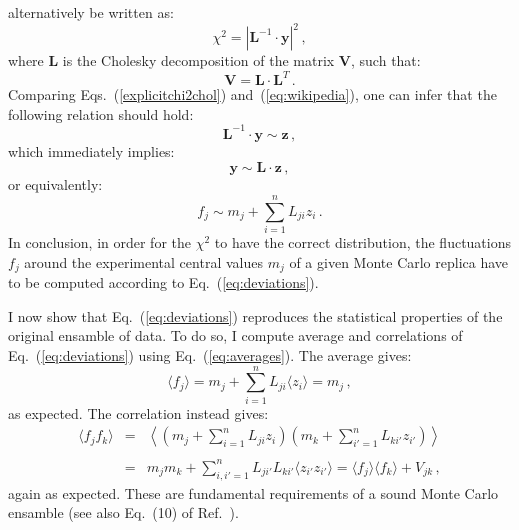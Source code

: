 \documentclass[10pt,a4paper]{article}
\begin{document}
alternatively be written as:
\begin{equation}\label{explicitchi2chol}
\chi^2 = \left|\mathbf{L}^{-1}\cdot \mathbf{y}\right|^2\,,
\end{equation}
where $\mathbf{L}$ is the Cholesky decomposition of the matrix
$\mathbf{V}$, such that:
\begin{equation}\label{eq:choleskydecagain}
\mathbf{V} = \mathbf{L}\cdot\mathbf{L}^{T}\,.
\end{equation}
Comparing Eqs.~(\ref{explicitchi2chol}) and~(\ref{eq:wikipedia}), one
can infer that the following relation should hold:
\begin{equation}
\mathbf{L}^{-1}\cdot \mathbf{y}\sim\mathbf{z}\,,
\end{equation}
which immediately implies:
\begin{equation}
\mathbf{y}\sim\mathbf{L}\cdot\mathbf{z}\,,
\end{equation}
or equivalently:
\begin{equation}\label{eq:deviations}
f_j\sim m_j+\sum_{i=1}^nL_{ji}z_i\,.
\end{equation}
In conclusion, in order for the $\chi^2$ to have the correct
distribution, the fluctuations $f_j$ around the experimental central
values $m_j$ of a given Monte Carlo replica have to be computed
according to Eq.~(\ref{eq:deviations}).

I now show that Eq.~(\ref{eq:deviations}) reproduces the statistical
properties of the original ensamble of data. To do so, I compute
average and correlations of Eq.~(\ref{eq:deviations}) using
Eq.~(\ref{eq:averages}). The average gives:
\begin{equation}
\langle f_j\rangle = m_j+\sum_{i=1}^nL_{ji}\langle z_i \rangle = m_j\,,
\end{equation}
as expected. The correlation instead gives:
\begin{equation}
\begin{array}{rcl}
\langle f_j f_k\rangle &=& \displaystyle \left\langle
  \left(m_j+\sum_{i=1}^nL_{ji}z_i\right)
  \left(m_k+\sum_{i'=1}^nL_{ki'}z_{i'}\right)\right\rangle\\
\\
&=& \displaystyle m_jm_k+\sum_{i,i'=1}^nL_{ji'}L_{ki'}\langle z_{i'}
    z_{i'}\rangle=\langle f_j \rangle\langle f_k\rangle+V_{jk}\,,
\end{array}
\end{equation}
again as expected. These are fundamental requirements of a sound Monte
Carlo ensamble (see also Eq.~(10) of Ref.~\cite{Ball:2009qv}).
\end{document}
